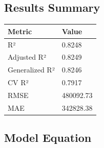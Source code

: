 \documentclass[
]{article}
\begin{document}
\subsection{Results Summary}\label{results-summary}

{\def\LTcaptype{} %
\begin{longtable}[]{@{}ll@{}}
\toprule\noalign{}
Metric & Value \\
\midrule\noalign{}
\endhead
\bottomrule\noalign{}
\endlastfoot
R² & 0.8248 \\
Adjusted R² & 0.8249 \\
Generalized R² & 0.8246 \\
CV R² & 0.7917 \\
RMSE & 480092.73 \\
MAE & 342828.38 \\
\end{longtable}
}

\subsection{Model Equation}\label{model-equation}
\end{document}
